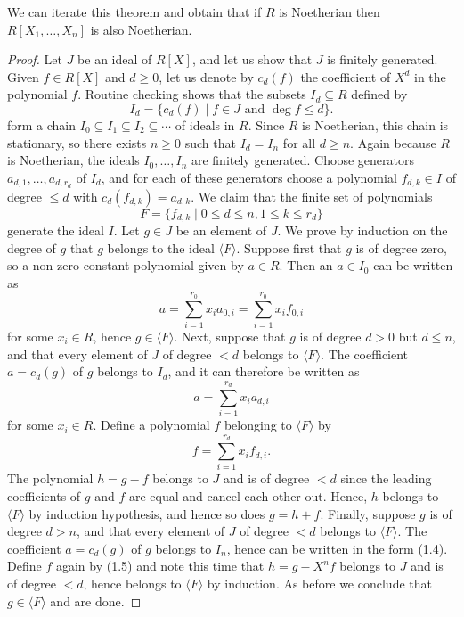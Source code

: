 \documentclass[12pt, a4paper]{article}
\begin{document}
\begin{mdnote}
    We can iterate this theorem and obtain that if \(R\) is Noetherian then \(R[X_1,\ldots,X_n]\) is also Noetherian.
\end{mdnote}

\begin{proof}
Let \( J \) be an ideal of \( R[X] \), and let us show that \( J \) is finitely generated. Given \( f \in R[X] \) and \( d \geq 0 \), let us denote by \( c_d(f) \) the coefficient of \( X^d \) in the polynomial \( f \). Routine checking shows that the subsets \( I_d \subseteq R \) defined by
\[ I_d = \{c_d(f) \mid f \in J \text{ and } \deg f \leq d\}. \]
form a chain \( I_0 \subseteq I_1 \subseteq I_2 \subseteq \cdots \) of ideals in \( R \). Since \( R \) is Noetherian, this chain is stationary, so there exists \( n \geq 0 \) such that \( I_d = I_n \) for all \( d \geq n \). Again because \( R \) is Noetherian, the ideals \( I_0, \ldots, I_n \) are finitely generated. Choose generators \( a_{d,1}, \ldots, a_{d,r_d} \) of \( I_d \), and for each of these generators choose a polynomial \( f_{d,k} \in I \) of degree \( \leq d \) with \( c_d(f_{d,k}) = a_{d,k} \). We claim that the finite set of polynomials
\[ F = \{f_{d,k} \mid 0 \leq d \leq n, 1 \leq k \leq r_d\} \]
generate the ideal \( I \). Let \( g \in J \) be an element of \( J \). We prove by induction on the degree of \( g \) that \( g \) belongs to the ideal \( \langle F \rangle \). Suppose first that \( g \) is of degree zero, so a non-zero constant polynomial given by \(a\in R\). Then an \( a \in I_0 \) can be written as
\[ a = \sum_{i=1}^{r_0} x_i a_{0,i} = \sum_{i=1}^{r_0} x_i f_{0,i} \]
for some \( x_i \in R \), hence \( g \in \langle F \rangle \). Next, suppose that \( g \) is of degree \( d > 0 \) but \( d \leq n \), and that every element of \( J \) of degree \( < d \) belongs to \( \langle F \rangle \). The coefficient \( a = c_d(g) \) of \( g \) belongs to \( I_d \), and it can therefore be written as
\[ a = \sum_{i=1}^{r_d} x_i a_{d,i}  \]
for some \( x_i \in R \). Define a polynomial \( f \) belonging to \( \langle F \rangle \) by
\[ f = \sum_{i=1}^{r_d} x_i f_{d,i}.  \]
The polynomial \( h = g - f \) belongs to \( J \) and is of degree \( < d \) since the leading coefficients of \( g \) and \( f \) are equal and cancel each other out. Hence, \( h \) belongs to \( \langle F \rangle \) by induction hypothesis, and hence so does \( g = h + f \). Finally, suppose \( g \) is of degree \( d > n \), and that every element of \( J \) of degree \( < d \) belongs to \( \langle F \rangle \). The coefficient \( a = c_d(g) \) of \( g \) belongs to \( I_n \), hence can be written in the form (1.4). Define \( f \) again by (1.5) and note this time that \( h = g - X^n f \) belongs to \( J \) and is of degree \( < d \), hence belongs to \( \langle F \rangle \) by induction. As before we conclude that \( g \in \langle F \rangle \) and are done.
\end{proof}
\end{document}

